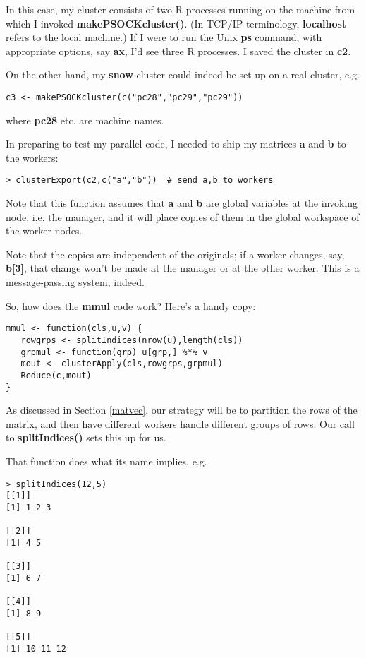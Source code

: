 In this case, my cluster consists of two R processes running on the
machine from which I invoked {\bf makePSOCKcluster()}.  (In TCP/IP
terminology, {\bf localhost} refers to the local machine.)  If I were to
run the Unix {\bf ps} command, with appropriate options, say {\bf ax},
I'd see three R processes.  I saved the cluster in {\bf c2}.

On the other hand, my {\bf snow} cluster could indeed be set up on a
real cluster, e.g.

\begin{lstlisting}
c3 <- makePSOCKcluster(c("pc28","pc29","pc29"))
\end{lstlisting}

where {\bf pc28} etc. are machine names.

In preparing to test my parallel code, I needed to ship my matrices {\bf
a} and {\bf b} to the workers:

\begin{lstlisting}
> clusterExport(c2,c("a","b"))  # send a,b to workers
\end{lstlisting}

Note that this function assumes that {\bf a} and {\bf b} are global
variables at the invoking node, i.e. the manager, and it will place
copies of them in the global workspace of the worker nodes.

Note that the copies are independent of the originals; if a worker
changes, say, {\bf b[3]}, that change won't be made at the manager or at
the other worker.  This is a message-passing system, indeed.

So, how does the {\bf mmul} code work?  Here's a handy copy:

\begin{lstlisting}
mmul <- function(cls,u,v) {
   rowgrps <- splitIndices(nrow(u),length(cls))
   grpmul <- function(grp) u[grp,] %*% v
   mout <- clusterApply(cls,rowgrps,grpmul)
   Reduce(c,mout)
}
\end{lstlisting}

As discussed in Section \ref{matvec}, our strategy will be to partition
the rows of the matrix, and then have different workers handle different
groups of rows.  Our call to {\bf splitIndices()} sets this up for us.

That function does what its name implies, e.g.

\begin{lstlisting}
> splitIndices(12,5)
[[1]]
[1] 1 2 3

[[2]]
[1] 4 5

[[3]]
[1] 6 7

[[4]]
[1] 8 9

[[5]]
[1] 10 11 12
\end{lstlisting}


